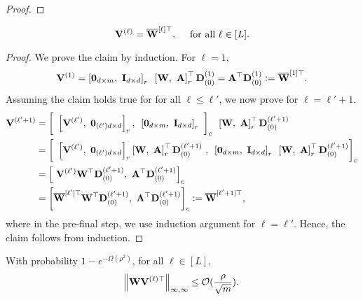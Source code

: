 \begin{proof}
\end{proof}




\begin{claim}\label{claim:induct_VW_proof}
	\begin{equation*}
		\mathbf{V}^{(\ell)} = \overline{\mathbf{W}}^{[\ell]\top}, \quad \text{ for all } \ell \in [L].
	\end{equation*}
\end{claim}

\begin{proof}
	We prove the claim by induction. For $\ell = 1$,
	\begin{equation*}
		\mathbf{V}^{(1)} = \left[\mathbf{0}_{d \times m}, \text{ } \mathbf{I}_{d \times d}\right]_r \text{ } \left[\mathbf{W}, \text{ } \mathbf{A}\right]_r^{\top} \mathbf{D}_{(0)}^{(1)} = \mathbf{A}^{\top} \mathbf{D}_{(0)}^{(1)} := \overline{\mathbf{W}}^{
			[1]\top}.
	\end{equation*}
	Assuming the claim holds true for for all $\ell \le \ell'$, we now prove for $\ell = \ell' + 1$.
	\begin{align*}
		\mathbf{V}^{(\ell' + 1)} &= \left[\text{ }\left[\mathbf{V}^{(\ell')}, \text{ } \mathbf{0}_{(\ell')d \times d}\right]_r,\text{ } \left[\mathbf{0}_{d \times m},\text{ } \mathbf{I}_{d \times d}\right]_r\text{ }\right]_c \text{ }\left[\mathbf{W}, \text{ } \mathbf{A}\right]_r^{\top} \mathbf{D}_{(0)}^{(\ell'+1)}\\
		&= \left[\text{ }\left[\mathbf{V}^{(\ell')}, \text{ } \mathbf{0}_{(\ell')d \times d}\right]_r \left[\mathbf{W}, \text{ } \mathbf{A}\right]_r^{\top} \mathbf{D}_{(0)}^{(\ell'+1)} \text{ },  \text{ } \left[\mathbf{0}_{d \times m},\text{ } \mathbf{I}_{d \times d}\right]_r\text{ } \left[\mathbf{W}, \text{ } \mathbf{A}\right]_r^{\top} \mathbf{D}_{(0)}^{(\ell'+1)}\right]_c\\
		&= \left[\text{ }\mathbf{V}^{(\ell')} \mathbf{W}^{\top}\mathbf{D}_{(0)}^{(\ell'+1)},  \text{ } \mathbf{A}^{\top}\mathbf{D}_{(0)}^{(\ell'+1)}\right]_c\\
		&= \left[\overline{\mathbf{W}}^{[\ell']\top}\mathbf{W}^{\top}\mathbf{D}_{(0)}^{(\ell'+1)},  \text{ } \mathbf{A}^{\top}\mathbf{D}_{(0)}^{(\ell'+1)}\right]_c := \overline{\mathbf{W}}^{[\ell' + 1]\top},
	\end{align*}
	where in the pre-final step, we use induction argument for $\ell = \ell'$. Hence, the claim follows from induction.
\end{proof}

\begin{claim}\label{claim:inftyinftyWV}
	With probability $1 - e^{-\Omega(\rho^2)}$, for all $\ell \in [L]$,
	\begin{align*}
		\norm{\mathbf{W} \mathbf{V}^{(\ell)\top}}_{\infty, \infty} \le \mathcal{O}(\frac{\rho}{\sqrt{m}}).
	\end{align*}
\end{claim}

